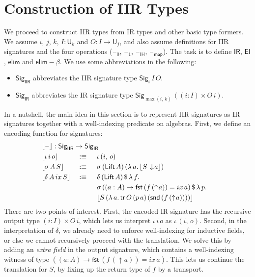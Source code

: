 \documentclass[acmsmall,screen,review,anonymous]{acmart}
\newcommand{\msf}[1]{{\mathsf{#1}}}
\newcommand{\U}{\msf{U}}
\newcommand{\El}{\msf{El}}
\newcommand{\Lift}{\msf{Lift}}
\newcommand{\lup}{\uparrow}
\newcommand{\ldown}{\downarrow}
\newcommand{\Sig}{\msf{Sig}}
\newcommand{\blank}{{\mathord{\hspace{1pt}\text{--}\hspace{1pt}}}}
\newcommand{\ix}{{ix}}
\newcommand{\IR}{\msf{IR}}
\newcommand{\IH}{\msf{IH}}
\newcommand{\map}{\msf{map}}
\newcommand{\elim}{\msf{elim}}
\newcommand{\tr}{\msf{tr}}
\newcommand{\fst}{\msf{fst}}
\newcommand{\snd}{\msf{snd}}
\newcommand{\IIR}{\msf{IIR}}
\newcommand{\Sigr}[1]{\lfloor #1 \rfloor}
\begin{document}
\section{Construction of IIR Types}\label{sec:iir-construction}

We proceed to construct IIR types from IR types and other basic type formers. We assume $i$, $j$,
$k$, $I : \U_k$ and $O : I \to \U_j$, and also assume definitions for IIR signatures and the four
operations ($\blank_0$, $\blank_1$, $\blank_\IH$, $\blank_\map$). The task is to define $\IR$,
$\El$, $\elim$ and $\elim\!-\!\!\beta$. We use some abbreviations in the following:
\begin{itemize}
\item $\Sig_\IIR$ abbreviates the IIR signature type $\Sig_i\,I\,O$.
\item $\Sig_\IR$ abbreviates the IR signature type $\Sig_{\max(i,\,k)}\,((i : I) \times O\,i)$.
\end{itemize}
In a nutshell, the main idea in this section is to represent IIR signatures as IR signatures
together with a well-indexing predicate on algebras. First, we define an encoding function for
signatures:
\begin{alignat*}{4}
  & \rlap{$\Sigr{\blank} : \Sig_\IIR \to \Sig_\IR$}\\
  & \Sigr{\iota\,i\,o}       &&:\equiv \hspace{0.5em} &&\iota\,(i,\,o)\\
  & \Sigr{\sigma\,A\,S}      &&:\equiv \hspace{0.5em} &&\sigma\,(\Lift\,A)\,(\lambda\,a.\,\Sigr{S\,\ldown\!a})\\
  & \Sigr{\delta\,A\,\ix\,S} &&:\equiv \hspace{0.5em} &&\delta\,(\Lift\,A)\,\$\,\lambda\,f.\\
  &  &&                                &&\sigma\,((a : A) \to \fst\,(f\,(\lup\!a)) = \ix\,a)\,\$\,\lambda\,p.\\
  &  &&                                &&\Sigr{S\,(\lambda\,a.\,\tr\,O\,(p\,a)\,(\snd\,(f\,(\lup\! a))))}
\end{alignat*}
There are two points of interest. First, the encoded IR signature has the recursive output type $(i
: I) \times O\,i$, which lets us interpret $\iota\,i\,o$ as $\iota\,(i,\,o)$. Second, in the
interpretation of $\delta$, we already need to enforce well-indexing for inductive fields, or else
we cannot recursively proceed with the translation. We solve this by adding an \emph{extra field} in
the output signature, which contains a well-indexing witness of type $((a : A) \to \fst\,(f\,(\lup\!a)) = \ix\,a)$.
This lets us continue the translation for $S$, by fixing up the return type of $f$ by a transport.
\end{document}
